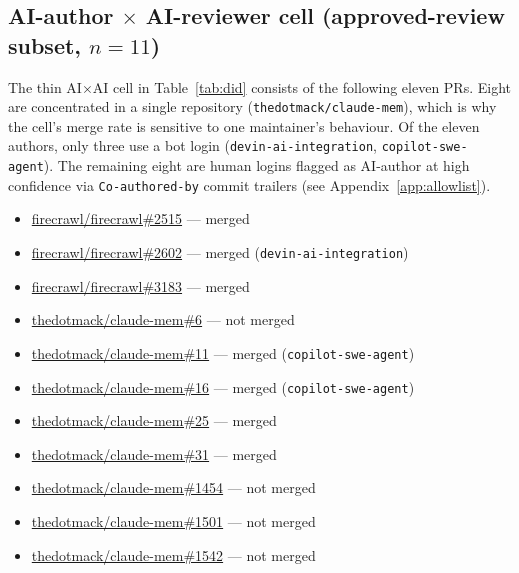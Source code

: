 
\subsection{AI-author $\times$ AI-reviewer cell (approved-review subset, $n=11$)}
\label{app:examples-aixai}

The thin AI$\times$AI cell in Table~\ref{tab:did} consists of the following
eleven PRs. Eight are concentrated in a single repository
(\texttt{thedotmack/claude-mem}), which is why the cell's merge rate is
sensitive to one maintainer's behaviour. Of the eleven authors, only three
use a bot login (\texttt{devin-ai-integration}, \texttt{copilot-swe-agent}).
The remaining eight are human logins flagged as AI-author at high confidence
via \texttt{Co-authored-by} commit trailers (see
Appendix~\ref{app:allowlist}).

\begin{itemize}\itemsep0pt\parskip0pt
  \item \href{https://github.com/firecrawl/firecrawl/pull/2515}{firecrawl/firecrawl\#2515} --- merged
  \item \href{https://github.com/firecrawl/firecrawl/pull/2602}{firecrawl/firecrawl\#2602} --- merged (\texttt{devin-ai-integration})
  \item \href{https://github.com/firecrawl/firecrawl/pull/3183}{firecrawl/firecrawl\#3183} --- merged
  \item \href{https://github.com/thedotmack/claude-mem/pull/6}{thedotmack/claude-mem\#6} --- not merged
  \item \href{https://github.com/thedotmack/claude-mem/pull/11}{thedotmack/claude-mem\#11} --- merged (\texttt{copilot-swe-agent})
  \item \href{https://github.com/thedotmack/claude-mem/pull/16}{thedotmack/claude-mem\#16} --- merged (\texttt{copilot-swe-agent})
  \item \href{https://github.com/thedotmack/claude-mem/pull/25}{thedotmack/claude-mem\#25} --- merged
  \item \href{https://github.com/thedotmack/claude-mem/pull/31}{thedotmack/claude-mem\#31} --- merged
  \item \href{https://github.com/thedotmack/claude-mem/pull/1454}{thedotmack/claude-mem\#1454} --- not merged
  \item \href{https://github.com/thedotmack/claude-mem/pull/1501}{thedotmack/claude-mem\#1501} --- not merged
  \item \href{https://github.com/thedotmack/claude-mem/pull/1542}{thedotmack/claude-mem\#1542} --- not merged
\end{itemize}

